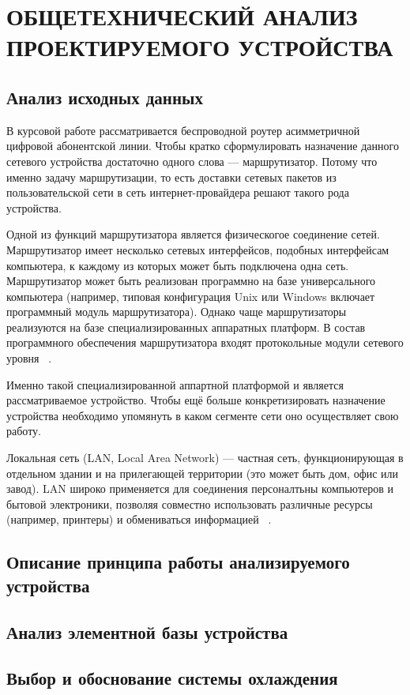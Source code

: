 \section{ОБЩЕТЕХНИЧЕСКИЙ АНАЛИЗ ПРОЕКТИРУЕМОГО УСТРОЙСТВА}
\subsection{Анализ исходных данных}
\par
В курсовой работе рассматривается беспроводной роутер асимметричной
цифровой абонентской линии.  Чтобы кратко сформулировать назначение
данного сетевого устройства достаточно одного слова — маршрутизатор.
Потому что именно задачу маршрутизации, то есть доставки сетевых
пакетов из пользовательской сети в сеть интернет-провайдера решают
такого рода устройства.
\par
Одной из функций маршрутизатора является физическогое соединение
сетей. Маршрутизатор имеет несколько сетевых интерфейсов, подобных
интерфейсам компьютера, к каждому из которых может быть подключена
одна сеть. Маршрутизатор может быть реализован программно на базе
универсального компьютера (например, типовая конфигурация Unix или
Windows включает программный модуль маршрутизатора). Однако чаще
маршрутизаторы реализуются на базе специализированных аппаратных
платформ. В состав программного обеспечения маршрутизатора входят
протокольные модули сетевого уровня ~\cite{NetworksOlifer2016}.
\par
Именно такой специализированной аппартной платформой и является
рассматриваемое устройство. Чтобы ещё больше конкретизировать
назначение устройства необходимо упомянуть в каком сегменте сети оно
осуществляет свою работу.
\par
Локальная сеть (LAN, Local Area Network) — частная сеть,
функционирующая в отдельном здании и на прилегающей территории
(это может быть дом, офис или завод). LAN широко применяется для соединения персоналтьны компьютеров и бытовой электроники, позволяя совместно
использовать различные ресурсы (например, принтеры) и обмениваться
информацией ~\cite{NetworksTanenbaum2023}.

\subsection{Описание принципа работы анализируемого устройства}
\subsection{Анализ элементной базы устройства}
\subsection{Выбор и обоснование системы охлаждения}

\newpage